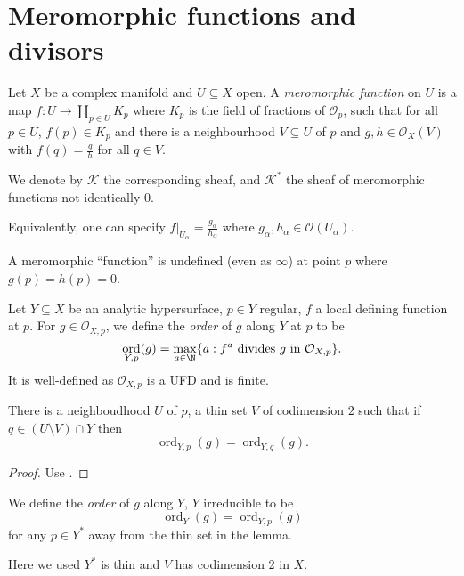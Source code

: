 \documentclass[a4paper]{article}
\DeclareMathOperator{\ord}{ord} %
\begin{document}
\section{Meromorphic functions and divisors}

\begin{definition}
  Let \(X\) be a complex manifold and \(U \subseteq X\) open. A \emph{meromorphic function} on \(U\) is a map \(f: U \to \coprod_{p \in U} K_p\) where \(K_p\) is the field of fractions of \(\mathcal O_p\), such that for all \(p \in U\), \(f(p) \in K_p\) and there is a neighbourhood \(V \subseteq U\) of \(p\) and \(g, h \in \mathcal O_X(V)\) with \(f(q) = \frac{g}{h}\) for all \(q \in V\).

  We denote by \(\mathcal K\) the corresponding sheaf, and \(\mathcal K^*\) the sheaf of meromorphic functions not identically \(0\).
\end{definition}

\begin{ex}
  Equivalently, one can specify \(f|_{U_\alpha} = \frac{g_\alpha}{h_\alpha}\) where \(g_\alpha, h_\alpha \in \mathcal O(U_\alpha)\).
\end{ex}

A meromorphic ``function'' is undefined (even as \(\infty\)) at point \(p\) where \(g(p) = h(p) = 0\).

\begin{definition}
  Let \(Y \subseteq X\) be an analytic hypersurface, \(p \in Y\) regular, \(f\) a local defining function at \(p\). For \(g \in \mathcal O_{X, p}\), we define the \emph{order} of \(g\) along \(Y\) at \(p\) to be
  \[
    \ord_{Y, p}(g) = \max_{a \in \N} \{a: f^a \text{ divides } g \text{ in } \mathcal O_{X, p}\}.
  \]
  It is well-defined as \(\mathcal O_{X, p}\) is a UFD and is finite.
\end{definition}

\begin{lemma}
  There is a neighboudhood \(U\) of \(p\), a thin set \(V\) of codimension \(2\) such that if \(q \in (U \setminus V) \cap Y\) then
  \[
    \ord_{Y, p}(g) = \ord_{Y, q}(g).
  \]
\end{lemma}

\begin{proof}
  Use .
\end{proof}

\begin{definition}[order]
  We define the \emph{order} of \(g\) along \(Y\), \(Y\) irreducible to be
  \[
    \ord_Y(g) = \ord_{Y, p}(g)
  \]
  for any \(p \in Y^*\) away from the thin set in the lemma.
\end{definition}
Here we used \(Y^*\) is thin and \(V\) has codimension 2 in \(X\).
\end{document}
